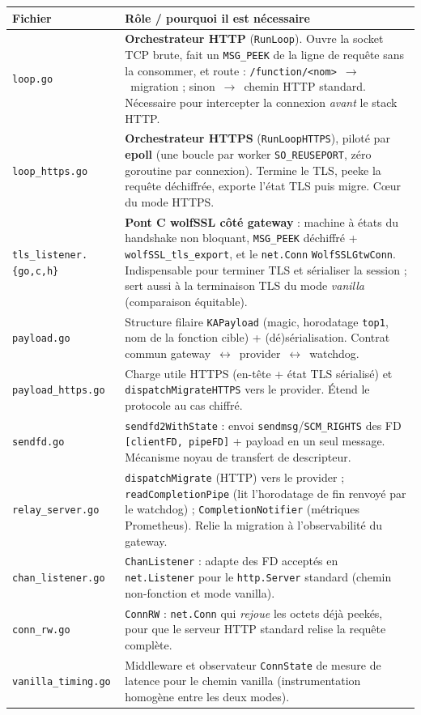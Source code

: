 \documentclass[10pt,a4paper]{article}
\newcommand{\code}[1]{\texttt{\small #1}}
\begin{document}
\begin{center}\footnotesize
\begin{tabular}{@{}p{3.15cm} p{13.4cm}@{}}
\toprule
\textbf{Fichier} & \textbf{Rôle / pourquoi il est nécessaire} \\
\midrule
\code{loop.go} & \textbf{Orchestrateur HTTP} (\code{RunLoop}). Ouvre la socket TCP brute, fait un \code{MSG\_PEEK} de la ligne de requête sans la consommer, et route : \code{/function/<nom>}~$\rightarrow$~migration ; sinon~$\rightarrow$~chemin HTTP standard. Nécessaire pour intercepter la connexion \emph{avant} le stack HTTP. \\
\code{loop\_https.go} & \textbf{Orchestrateur HTTPS} (\code{RunLoopHTTPS}), piloté par \textbf{epoll} (une boucle par worker \code{SO\_REUSEPORT}, zéro goroutine par connexion). Termine le TLS, peeke la requête déchiffrée, exporte l'état TLS puis migre. Cœur du mode HTTPS. \\
\code{tls\_listener.\{go,c,h\}} & \textbf{Pont C wolfSSL côté gateway} : machine à états du handshake non bloquant, \code{MSG\_PEEK} déchiffré + \code{wolfSSL\_tls\_export}, et le \code{net.Conn} \code{WolfSSLGtwConn}. Indispensable pour terminer TLS et sérialiser la session ; sert aussi à la terminaison TLS du mode \emph{vanilla} (comparaison équitable). \\
\code{payload.go} & Structure filaire \code{KAPayload} (magic, horodatage \code{top1}, nom de la fonction cible) + (dé)sérialisation. Contrat commun gateway~$\leftrightarrow$~provider~$\leftrightarrow$~watchdog. \\
\code{payload\_https.go} & Charge utile HTTPS (en-tête + état TLS sérialisé) et \code{dispatchMigrateHTTPS} vers le provider. Étend le protocole au cas chiffré. \\
\code{sendfd.go} & \code{sendfd2WithState} : envoi \code{sendmsg}/\code{SCM\_RIGHTS} des FD \code{[clientFD, pipeFD]} + payload en un seul message. Mécanisme noyau de transfert de descripteur. \\
\code{relay\_server.go} & \code{dispatchMigrate} (HTTP) vers le provider ; \code{readCompletionPipe} (lit l'horodatage de fin renvoyé par le watchdog) ; \code{CompletionNotifier} (métriques Prometheus). Relie la migration à l'observabilité du gateway. \\
\code{chan\_listener.go} & \code{ChanListener} : adapte des FD acceptés en \code{net.Listener} pour le \code{http.Server} standard (chemin non-fonction et mode vanilla). \\
\code{conn\_rw.go} & \code{ConnRW} : \code{net.Conn} qui \emph{rejoue} les octets déjà peekés, pour que le serveur HTTP standard relise la requête complète. \\
\code{vanilla\_timing.go} & Middleware et observateur \code{ConnState} de mesure de latence pour le chemin vanilla (instrumentation homogène entre les deux modes). \\
\bottomrule
\end{tabular}
\end{center}
\end{document}
